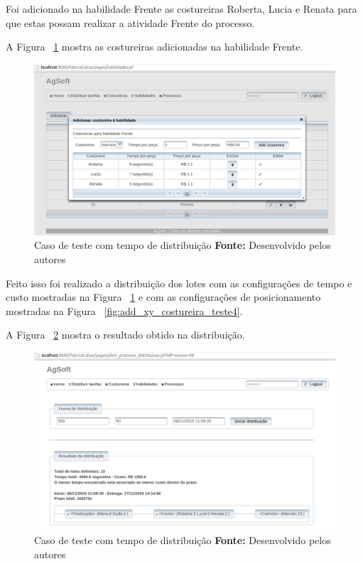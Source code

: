 \par Foi adicionado na habilidade Frente as costureiras Roberta, Lucia e Renata
para que estas possam realizar a atividade Frente do processo.
\par A Figura ~\ref{fig:add_costureira_frente_teste4} mostra as costureiras
adicionadas na habilidade Frente.

\begin{figure}[h!]
	\centerline{\includegraphics[scale=0.3]{./imagens/costureiras_at_frente_tete5.png}}
	\caption[Caso de teste com tempo de distribuição]
	{Caso de teste com tempo de distribuição \textbf{Fonte:} Desenvolvido pelos autores}
	\label{fig:add_costureira_frente_teste4}
\end{figure}

\par Feito isso foi realizado a distribuição dos lotes com as configurações de
tempo e custo mostradas na Figura ~\ref{fig:add_costureira_frente_teste4} e com
as configurações de posicionamento mostradas na Figura
~\ref{fig:add_xy_costureira_teste4}.
\par A Figura ~\ref{fig:resultado1_teste5} mostra o resultado obtido na
distribuição.

\newpage

\begin{figure}[h!]
	\centerline{\includegraphics[scale=0.3]{./imagens/resultado1_teste5.png}}
	\caption[Caso de teste com tempo de distribuição]
	{Caso de teste com tempo de distribuição \textbf{Fonte:} Desenvolvido pelos autores}
	\label{fig:resultado1_teste5}
\end{figure}

